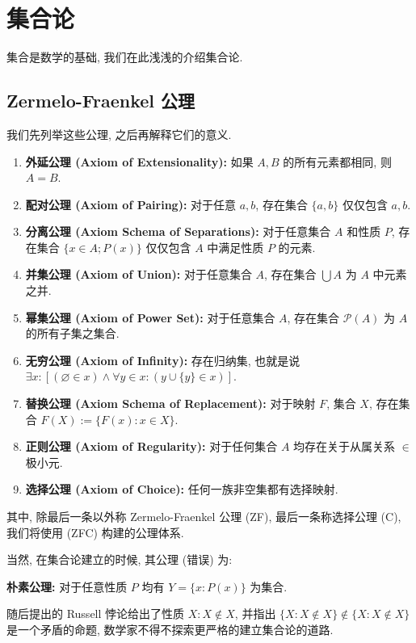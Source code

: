 \section{集合论}

集合是数学的基础, 我们在此浅浅的介绍集合论.

\subsection{Zermelo-Fraenkel 公理}

我们先列举这些公理, 之后再解释它们的意义.

\begin{enumerate}
    \item \textbf{外延公理 (Axiom of Extensionality):} 如果 \(A, B\) 的所有元素都相同, 则 \(A = B\).
    \item \textbf{配对公理 (Axiom of Pairing):} 对于任意 \(a, b\), 存在集合 \(\{a,b\}\) 仅仅包含 \(a,b\).
    \item \textbf{分离公理 (Axiom Schema of Separations):} 对于任意集合 \(A\) 和性质 \(P\), 存在集合 \(\{x \in A; P(x)\}\) 仅仅包含 \(A\) 中满足性质 \(P\) 的元素.
    \item \textbf{并集公理 (Axiom of Union):} 对于任意集合 \(A\), 存在集合 \(\bigcup A\) 为 \(A\) 中元素之并.
    \item \textbf{幂集公理 (Axiom of Power Set):} 对于任意集合 \(A\), 存在集合 \(\mathcal{P}(A)\) 为 \(A\) 的所有子集之集合.
    \item \textbf{无穷公理 (Axiom of Infinity):} 存在归纳集, 也就是说 \(\exists x : [(\varnothing \in x) \wedge \forall y \in x : (y \cup \{y\} \in x)]\).
    \item \textbf{替换公理 (Axiom Schema of Replacement):} 对于映射 \(F\), 集合 \(X\), 存在集合 \(F(X) := \{F(x) : x \in X\}\).
    \item \textbf{正则公理 (Axiom of Regularity):} 对于任何集合 \(A\) 均存在关于从属关系 \(\in\) 极小元.
    \item \textbf{选择公理 (Axiom of Choice):} 任何一族非空集都有选择映射.
\end{enumerate}

其中, 除最后一条以外称 Zermelo-Fraenkel 公理 (ZF), 最后一条称选择公理 (C), 我们将使用 (ZFC) 构建的公理体系.

当然, 在集合论建立的时候, 其公理 (错误) 为:

\textbf{朴素公理:} 对于任意性质 \(P\) 均有 \(Y = \{x : P(x)\}\) 为集合.

随后提出的 Russell 悖论给出了性质 \(X:X \notin X\), 并指出 \(\{X : X \notin X\} \notin \{X : X \notin X\}\)
是一个矛盾的命题, 数学家不得不探索更严格的建立集合论的道路.

